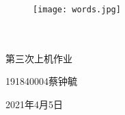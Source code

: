 \documentclass[a4paper,10.5pt]{ctexart}
\begin{document}
	\begin{figure}[t]
		\parbox[b]{2cm}{
			
			}
		\parbox[b]{9cm}{
			\begin{center}
				\texttt{[image: words.jpg]}

				\small \textbf{ } 
			\end{center}
			}
	\end{figure}

	\begin{center}
		\quad \\
		\quad \\
		\vskip 3.5cm
		\heiti {} 第三次上机作业	
	\end{center}


	\begin{center}
		\songti \fontsize{15}{15}
		\doublespacing
		
		\quad 

		\large191840004\hspace{0.6cm}蔡钟毓

	\end{center}
	\begin{center}
		\songti \fontsize{15}{15}
		\doublespacing
		
		\quad 

		\large2021年4月5日

	\end{center}

\clearpage

\date{}

\end{document}

